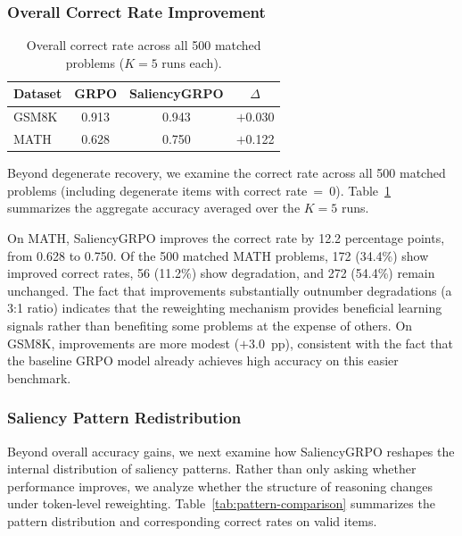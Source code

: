 \documentclass[12pt]{report}
\begin{document}
\subsubsection{Overall Correct Rate Improvement}

\begin{table}[t]
\centering
\caption{Overall correct rate across all 500 matched problems ($K=5$ runs each).}
\label{tab:overall-correct-rate}
\begin{tabular}{lccc}
\toprule
\textbf{Dataset} & \textbf{GRPO} & \textbf{SaliencyGRPO} & \textbf{$\Delta$} \\
\midrule
GSM8K & 0.913 & 0.943 & $+$0.030 \\
MATH  & 0.628 & 0.750 & $+$0.122 \\
\bottomrule
\end{tabular}
\end{table}

Beyond degenerate recovery, we examine the correct rate across all 500 matched problems (including
degenerate items with correct rate~=~0). Table~\ref{tab:overall-correct-rate} summarizes the aggregate accuracy averaged over the $K=5$ runs.

On MATH, SaliencyGRPO improves the correct rate by 12.2 percentage
points, from 0.628 to 0.750.  Of the 500 matched MATH problems, 172 (34.4\%) show improved
correct rates, 56 (11.2\%) show degradation, and 272 (54.4\%) remain unchanged.  The fact that improvements substantially outnumber degradations
(a 3:1 ratio) indicates that the reweighting mechanism
provides beneficial learning signals rather than benefiting some problems at the expense of others.
On GSM8K, improvements are more modest ($+3.0$~pp), consistent with the fact that the
baseline GRPO model already achieves high accuracy on this easier benchmark.

\subsubsection{Saliency Pattern Redistribution}
Beyond overall accuracy gains, we next examine how SaliencyGRPO
reshapes the internal distribution of saliency patterns. Rather than
only asking whether performance improves, we analyze whether the
structure of reasoning changes under token-level reweighting.
Table~\ref{tab:pattern-comparison} summarizes the pattern distribution
and corresponding correct rates on valid items.
\end{document}
